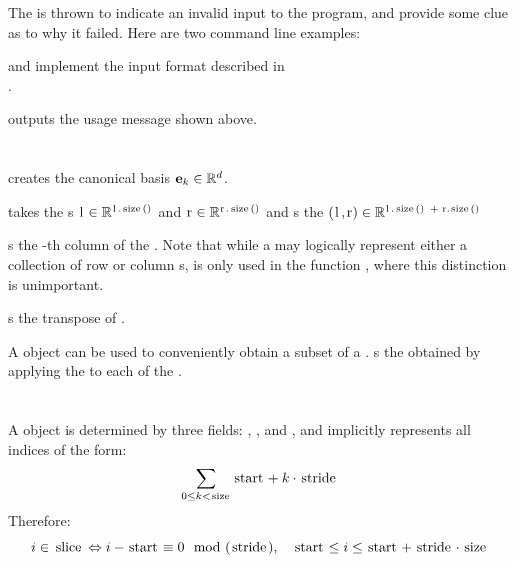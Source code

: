 The  is thrown to indicate an invalid input to the program, and provide some clue as to why it failed.  Here are two command line examples:

\lstinputerror

 and  implement the input format described in \\.
\lstissV
\lstossV

 outputs the usage message shown above.
\lstusage

\section{}
 creates the canonical basis  $\mathbf{e}_k \in \mathbb{R}^d$.
\lstek

 takes the s $\mli{l} \in \R^{\mli{l.size()}}$ and $\mli{r} \in \R^{\mli{r.size()}}$ and s the  $(\mli{l,r}) \in \R^{\mli{l.size() + r.size()}}$
\lstconcatenate

 s the -th column of the .  Note that while a  may logically represent either a collection of row or column s,  is only used in the function , where this distinction is unimportant.
\lstgetcolumn

 s the transpose of .
\lsttranspose

A  object can be used to conveniently obtain a subset of a .   s the  obtained by applying the  to each  of the .
\lstslicematrix

\section{}

A  object is determined by three fields: , , and , and implicitly represents all indices of the form:
\[ \sum_{0 \leq k < \mli{size}} \mli{start} + k\cdot\mli{stride} \]
Therefore:
\[ i \in \mli{slice} \Leftrightarrow i - \mli{start} \equiv 0 \mod(\mli{stride}),
	\quad \mli{start} \leq i \leq \mli{start} + {\mli{stride}}\cdot\mli{size} \]
\lstindexinslice

